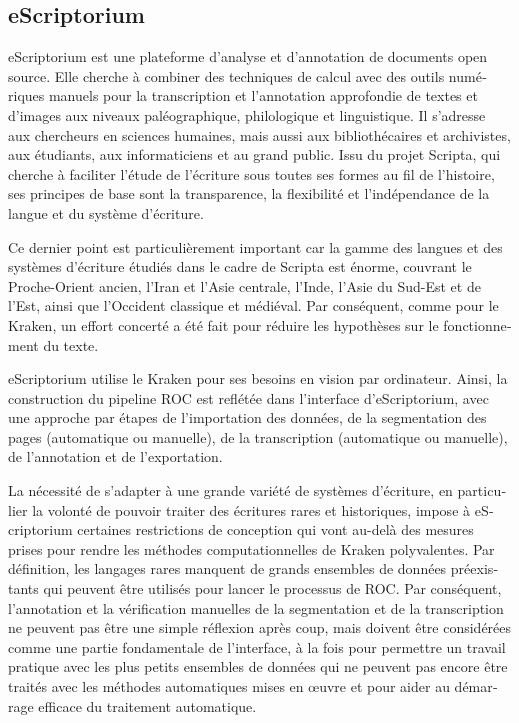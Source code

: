 \begin{french}
\section{eScriptorium}

eScriptorium est une plateforme d'analyse et d'annotation de documents open
source. Elle cherche à combiner des techniques de calcul avec des outils
numériques manuels pour la transcription et l'annotation approfondie de textes
et d'images aux niveaux paléographique, philologique et linguistique. Il
s'adresse aux chercheurs en sciences humaines, mais aussi aux bibliothécaires
et archivistes, aux étudiants, aux informaticiens et au grand public. Issu du
projet Scripta, qui cherche à faciliter l'étude de l'écriture sous toutes ses
formes au fil de l'histoire, ses principes de base sont la transparence, la
flexibilité et l'indépendance de la langue et du système d'écriture.

Ce dernier point est particulièrement important car la gamme des langues et des
systèmes d'écriture étudiés dans le cadre de Scripta est énorme, couvrant le
Proche-Orient ancien, l'Iran et l'Asie centrale, l'Inde, l'Asie du Sud-Est et
de l'Est, ainsi que l'Occident classique et médiéval. Par conséquent, comme
pour le Kraken, un effort concerté a été fait pour réduire les hypothèses sur
le fonctionnement du texte.

eScriptorium utilise le Kraken pour ses besoins en vision par ordinateur.
Ainsi, la construction du pipeline ROC est reflétée dans l'interface
d'eScriptorium, avec une approche par étapes de l'importation des données, de
la segmentation des pages (automatique ou manuelle), de la transcription
(automatique ou manuelle), de l'annotation et de l'exportation.

La nécessité de s'adapter à une grande variété de systèmes d'écriture, en
particulier la volonté de pouvoir traiter des écritures rares et historiques,
impose à eScriptorium certaines restrictions de conception qui vont au-delà des
mesures prises pour rendre les méthodes computationnelles de Kraken
polyvalentes. Par définition, les langages rares manquent de grands ensembles
de données préexistants qui peuvent être utilisés pour lancer le processus de
ROC.  Par conséquent, l'annotation et la vérification manuelles de la
segmentation et de la transcription ne peuvent pas être une simple réflexion
après coup, mais doivent être considérées comme une partie fondamentale de
l'interface, à la fois pour permettre un travail pratique avec les plus petits
ensembles de données qui ne peuvent pas encore être traités avec les méthodes
automatiques mises en œuvre et pour aider au démarrage efficace du traitement
automatique.


\end{french}
